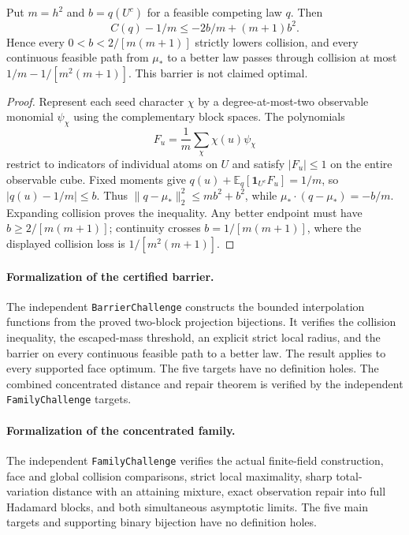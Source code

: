 \begin{proposition}
\label{s25:prop:design-concentrated-barrier}
Put $m=h^2$ and $b=q(U^c)$ for a feasible competing law $q$. Then
\[
 C(q)-1/m\le-2b/m+(m+1)b^2.
\]
Hence every $0<b<2/[m(m+1)]$ strictly lowers collision, and every
continuous feasible path from $\mu_*$ to a better law passes through
collision at most $1/m-1/[m^2(m+1)]$. This barrier is not claimed optimal.
\end{proposition}
\begin{proof}
Represent each seed character $\chi$ by a degree-at-most-two observable
monomial $\psi_\chi$ using the complementary block spaces. The polynomials
\[
 F_u=\frac1m\sum_\chi\chi(u)\psi_\chi
\]
restrict to indicators of individual atoms on $U$ and satisfy
$|F_u|\le1$ on the entire observable cube. Fixed moments give
$q(u)+\mathbb E_q[\mathbf1_{U^c}F_u]=1/m$, so
$|q(u)-1/m|\le b$. Thus
$\|q-\mu_*\|_2^2\le mb^2+b^2$, while
$\mu_*\cdot(q-\mu_*)=-b/m$. Expanding collision proves the inequality.
Any better endpoint must have $b\ge2/[m(m+1)]$; continuity crosses
$b=1/[m(m+1)]$, where the displayed collision loss is $1/[m^2(m+1)]$.
\end{proof}

\paragraph{Formalization of the certified barrier.}
The independent \texttt{BarrierChallenge} constructs the bounded
interpolation functions from the proved two-block projection bijections.
It verifies the collision inequality, the escaped-mass threshold, an
explicit strict local radius, and the barrier on every continuous feasible
path to a better law. The result applies to every supported face optimum.
The five targets have no definition holes. The combined concentrated distance and repair theorem is verified
by the independent \texttt{FamilyChallenge} targets.

\paragraph{Formalization of the concentrated family.}
The independent \texttt{FamilyChallenge} verifies the actual finite-field
construction, face and global collision comparisons, strict local maximality,
sharp total-variation distance with an attaining mixture, exact observation
repair into full Hadamard blocks, and both simultaneous asymptotic limits.
The five main targets and supporting binary bijection have no definition holes.

